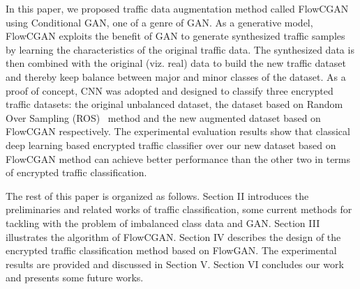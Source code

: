 \documentclass[conference]{IEEEtran}
\begin{document}
In this paper, we proposed traffic data augmentation method called FlowCGAN using Conditional GAN, one of a genre of GAN. As a generative model, FlowCGAN exploits the benefit of GAN to generate synthesized traffic samples by learning the characteristics of the original traffic data. The synthesized data is then combined with the original (viz. real) data to build the new traffic dataset and thereby keep balance between major and minor classes of the dataset. As a proof of concept, CNN was adopted and designed to classify three encrypted traffic datasets: the original unbalanced dataset, the dataset based on Random Over Sampling (ROS)~\cite{ROS2004} method and the new augmented dataset based on FlowCGAN respectively. The experimental evaluation results show that classical deep learning based encrypted traffic classifier over our new dataset based on FlowCGAN method can achieve better performance than the other two in terms of encrypted traffic classification.


The rest of this paper is organized as follows. Section II introduces the preliminaries and related works of traffic classification, some current methods for tackling with the problem of imbalanced class data and GAN. Section III illustrates the algorithm of FlowCGAN. Section IV describes the design of the encrypted traffic classification method based on FlowGAN. The experimental results are provided and discussed in Section V. Section VI  concludes our work and presents some future works.






\renewcommand\refname{Reference}


\end{document}
